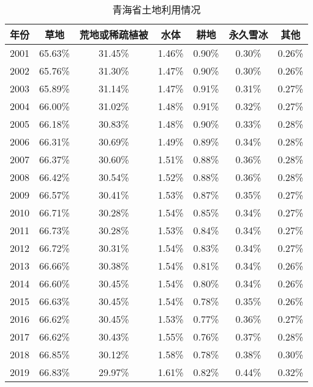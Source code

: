 \documentclass[AutoFakeBold]{LZUThesis-PgD&PhD}
\begin{document}
            \begin{table}[H]
                \centering
                \caption{青海省土地利用情况}
                \begin{tabular}{|c|c|c|c|c|c|c|}
                    \hline
                    年份 & 草地 & 荒地或稀疏植被 & 水体 & 耕地 & 永久雪冰 & 其他 \\
                    \hline
                    2001 & 65.63\% & 31.45\% & 1.46\% & 0.90\% & 0.30\% & 0.26\% \\
                    2002 & 65.76\% & 31.30\% & 1.47\% & 0.90\% & 0.30\% & 0.26\% \\
                    2003 & 65.89\% & 31.14\% & 1.47\% & 0.91\% & 0.31\% & 0.27\% \\
                    2004 & 66.00\% & 31.02\% & 1.48\% & 0.91\% & 0.32\% & 0.27\% \\
                    2005 & 66.18\% & 30.83\% & 1.48\% & 0.90\% & 0.33\% & 0.28\% \\
                    2006 & 66.31\% & 30.69\% & 1.49\% & 0.89\% & 0.34\% & 0.28\% \\
                    2007 & 66.37\% & 30.60\% & 1.51\% & 0.88\% & 0.36\% & 0.28\% \\
                    2008 & 66.42\% & 30.54\% & 1.52\% & 0.88\% & 0.36\% & 0.28\% \\
                    2009 & 66.57\% & 30.41\% & 1.53\% & 0.87\% & 0.35\% & 0.27\% \\
                    2010 & 66.71\% & 30.28\% & 1.54\% & 0.85\% & 0.34\% & 0.27\% \\
                    2011 & 66.73\% & 30.28\% & 1.53\% & 0.84\% & 0.34\% & 0.27\% \\
                    2012 & 66.72\% & 30.31\% & 1.54\% & 0.83\% & 0.34\% & 0.27\% \\
                    2013 & 66.66\% & 30.38\% & 1.54\% & 0.81\% & 0.34\% & 0.26\% \\
                    2014 & 66.60\% & 30.45\% & 1.54\% & 0.80\% & 0.34\% & 0.26\% \\
                    2015 & 66.63\% & 30.45\% & 1.54\% & 0.78\% & 0.35\% & 0.26\% \\
                    2016 & 66.62\% & 30.45\% & 1.53\% & 0.77\% & 0.36\% & 0.27\% \\
                    2017 & 66.62\% & 30.43\% & 1.55\% & 0.76\% & 0.37\% & 0.28\% \\
                    2018 & 66.85\% & 30.12\% & 1.58\% & 0.78\% & 0.38\% & 0.30\% \\
                    2019 & 66.83\% & 29.97\% & 1.61\% & 0.82\% & 0.44\% & 0.32\% \\
                    \hline
                \end{tabular}
            \end{table}
\end{document}
